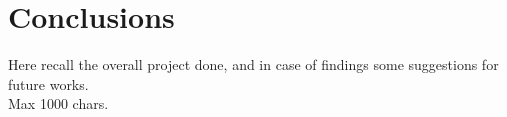 \section{Conclusions}

Here recall the overall project done, and in case of findings some suggestions for future works.\\

Max 1000 chars.